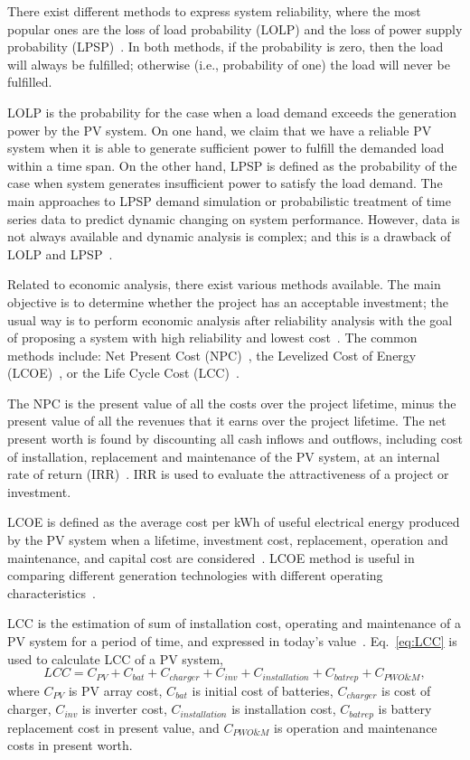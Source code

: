 There exist different methods to express system reliability, where the most popular ones 
are the loss of load probability (LOLP) and the loss of power supply probability (LPSP)~\cite{Alsadi2018}. In both methods, if the probability is zero, then the load will always be fulfilled; otherwise (i.e., probability of one) the load will never be fulfilled.

LOLP is the probability for the case when a load demand exceeds the generation power by the PV system. On one hand, we claim that we have a reliable PV system when it is able to generate sufficient power to fulfill the demanded load within a time span. On the other hand, LPSP is defined as the probability of the case when system generates insufficient power to satisfy the load demand. The main approaches to LPSP demand simulation or probabilistic treatment of time series data to predict dynamic changing on system performance. However, data is not always available and dynamic analysis is complex; and this is a drawback of LOLP and LPSP~\cite{Alsadi2018}.

Related to economic analysis, there exist various methods available. The main objective is to determine whether the project has an acceptable investment; the usual way is to perform economic analysis after reliability analysis with the goal of proposing a system with high reliability and lowest cost~\cite{Alsadi2018}. The common methods include: Net Present Cost (NPC)~\cite{Park2004}, the Levelized Cost of Energy (LCOE)~\cite{Zhou2010}, or the Life Cycle Cost (LCC)~\cite{Applasamy2011}.

The NPC is the present value of all the costs over the project lifetime, minus the present value of all the revenues that it earns over the project lifetime. The net present worth is found by discounting all cash inflows and outflows, including cost of installation, replacement and maintenance of the PV system, at an internal rate of return (IRR)~\cite{Park2004}. IRR is used to evaluate the attractiveness of a project or investment.

LCOE is defined as the average cost per kWh of useful electrical energy produced by the PV system when a lifetime, investment cost, replacement, operation and maintenance, and capital cost are considered~\cite{Kamel2005}. LCOE method is useful in comparing different generation technologies with different operating characteristics~\cite{Zhou2010}.

LCC is the estimation of sum of installation cost, operating and maintenance of a PV system for a period of time, and expressed in today's value~\cite{Applasamy2011}. Eq.~\eqref{eq:LCC} is used to calculate LCC of a PV system,
%
\begin{equation}
\label{eq:LCC}
LCC = C_{PV} + C_{bat} + C_{charger} + C_{inv} + C_{installation} + C_{batrep} + C_{PWO\&M},
\end{equation}
\noindent where $C_{PV}$ is PV array cost, $C_{bat}$ is initial cost of batteries, $C_{charger}$ is cost of charger, $C_{inv}$ is inverter cost, $C_{installation}$ is installation cost, $C_{batrep}$ is battery replacement cost in present value, and $C_{PWO\&M}$ is operation and maintenance costs 
in present worth.

